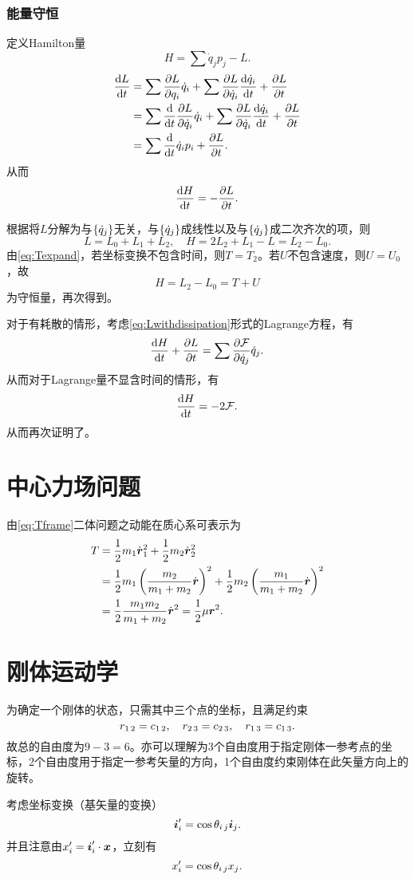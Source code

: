 \documentclass{ctexrep}
\begin{document}
\subsection{能量守恒}
定义Hamilton量
\[ H = \sum \dot{q}_j p_j - L. \]
\begin{align*}
  \frac{\mathrm{d} L}{\mathrm{d} t} &= \sum \frac{\partial L}{\partial q_i}\dot{q}_i + \sum \frac{\partial L}{\partial \dot{q}_i}\frac{\mathrm{d} \dot{q}_i}{\mathrm{d} t} + \frac{\partial L}{\partial t} \\
  &= \sum\frac{\mathrm{d}}{\mathrm{d} t}\frac{\partial L}{\partial \dot{q}_i}\dot{q}_i + \sum \frac{\partial L}{\partial \dot{q}_i}\frac{\mathrm{d} \dot{q}_i}{\mathrm{d} t} + \frac{\partial L}{\partial t} \\
  &= \sum \frac{\mathrm{d}}{\mathrm{d} t}{\dot{q}_i p_i} + \frac{\partial L}{\partial t}.
\end{align*}
从而
\[ \frac{\mathrm{d} H}{\mathrm{d} t} = -\frac{\partial L}{\partial t}. \]
\par
根据将$L$分解为与$\left\{\dot{q}_j\right\}$无关，与$\left\{\dot{q}_j\right\}$成线性以及与$\left\{\dot{q}_j\right\}$成二次齐次的项，则
\[ L = L_0 + L_1 + L_2, \quad H = 2L_2+L_1-L = L_2 - L_0. \]
由\eqref{eq:Texpand}，若坐标变换不包含时间，则$T=T_2$。若$U$不包含速度，则$U=U_0$，故
\[ H=L_2-L_0 = T+U \]
为守恒量，再次得到。
\par
对于有耗散的情形，考虑\eqref{eq:Lwithdissipation}形式的Lagrange方程，有
\[ \frac{\mathrm{d} H}{\mathrm{d} t} + \frac{\partial L}{\partial t} = \sum \frac{\partial \mathcal{F}}{\partial \dot{q}_j}\dot{q}_j. \]
从而对于Lagrange量不显含时间的情形，有
\[ \frac{\mathrm{d} H}{\mathrm{d} t} = -2\mathcal{F}. \]
从而再次证明了。

\chapter{中心力场问题}
由\eqref{eq:Tframe}二体问题之动能在质心系可表示为
\begin{align*}
T &= \frac{1}{2} m_1\dot{\boldsymbol{r}}_1^2+\frac{1}{2} m_2\dot{\boldsymbol{r}}_2^2 \\
&= \frac{1}{2} m_1\left(\frac{m_2}{m_1+m_2}\dot{\boldsymbol{r}}\right)^2 + \frac{1}{2} m_2\left(\frac{m_1}{m_1+m_2}\dot{\boldsymbol{r}}\right)^2 \\
&= \frac{1}{2}\frac{m_1m_2}{m_1+m_2}\dot{\boldsymbol{r}}^2 = \frac{1}{2}\mu\boldsymbol{r}^2.
\end{align*}


\chapter{刚体运动学}
为确定一个刚体的状态，只需其中三个点的坐标，且满足约束
\[ r_{1 \, 2} = c_{1 \, 2}, \quad r_{2 \, 3} = c_{2 \, 3}, \quad r_{1 \, 3} = c_{1 \, 3}. \]
故总的自由度为$9-3=6$。亦可以理解为3个自由度用于指定刚体一参考点的坐标，2个自由度用于指定一参考矢量的方向，1个自由度约束刚体在此矢量方向上的旋转。
\par
考虑坐标变换（基矢量的变换）
\[ \boldsymbol{i}'_i = \cos \theta_{i \, j}\boldsymbol{i}_j. \]
并且注意由$x'_i = \boldsymbol{i}'_i\cdot \boldsymbol{x}$，立刻有
\[ x'_i = \cos \theta_{i \, j} x_j. \]
\end{document}
